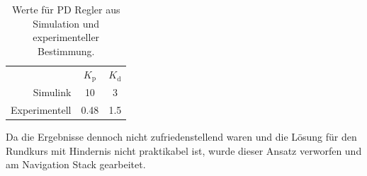 \begin{table}[h]
	\centering
	\begin{tabular}{rcc}
		 & $K_\text{p}$ & $K_\text{d}$ \\ 
		Simulink & 10 & 3 \\ 
		Experimentell & 0.48 & 1.5
	\end{tabular}
	\caption{Werte f\"ur PD Regler aus Simulation und experimenteller Bestimmung.}
	\label{tab:PD}
\end{table}

Da die Ergebnisse dennoch nicht zufriedenstellend waren und die L\"osung f\"ur den Rundkurs mit Hindernis nicht praktikabel ist, wurde dieser Ansatz verworfen und am Navigation Stack gearbeitet.

